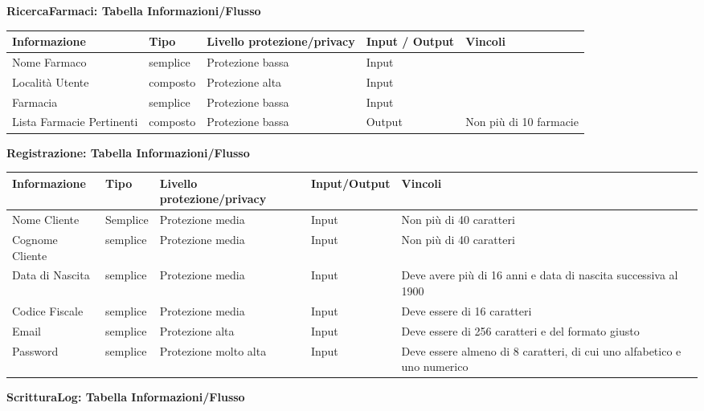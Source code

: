\textbf{RicercaFarmaci: Tabella Informazioni/Flusso}
\hfill \break

\begin{tabular} {|P{3cm}|P{3cm}|P{3cm}|P{3cm}|P{3cm}|}
    \hline
    \textbf{Informazione} & \textbf{Tipo} & \textbf{Livello protezione/privacy} & \textbf{Input / Output} & \textbf{Vincoli}\\
    \hline
    Nome Farmaco & semplice & Protezione bassa & Input & \\
    \hline
    Località Utente & composto & Protezione alta & Input & \\
    \hline
    Farmacia & semplice & Protezione bassa & Input & \\
    \hline
    Lista Farmacie Pertinenti & composto & Protezione bassa & Output & Non più di 10 farmacie \\
    \hline
\end{tabular}
\hfill \break

\textbf{Registrazione: Tabella Informazioni/Flusso}
\hfill \break

\begin{tabular} {|P{3cm}|P{3cm}|P{3cm}|P{3cm}|P{3cm}|}
    \hline
    \textbf{Informazione} & \textbf{Tipo} & \textbf{Livello protezione/privacy} & \textbf{Input/Output} & \textbf{Vincoli} \\
    \hline
    Nome Cliente & Semplice & Protezione media & Input & Non più di 40 caratteri \\
    \hline
    Cognome Cliente & semplice & Protezione media & Input & Non più di 40 caratteri \\
    \hline
    Data di Nascita & semplice & Protezione media & Input & Deve avere più di 16 anni e data di nascita successiva al 1900 \\
    \hline
    Codice Fiscale & semplice & Protezione media & Input & Deve essere di 16 caratteri \\
    \hline
    Email &  semplice & Protezione alta & Input & Deve essere di 256 caratteri e del formato giusto \\
    \hline
    Password & semplice & Protezione molto alta & Input & Deve essere almeno di 8 caratteri, di cui uno alfabetico e uno numerico \\
    \hline
\end{tabular}
\hfill \break

\textbf{ScritturaLog: Tabella Informazioni/Flusso}
\hfill \break

